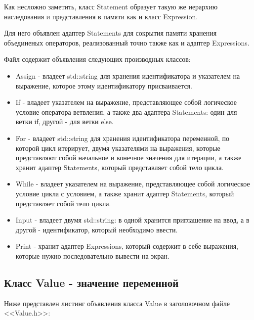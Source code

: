 Как несложно заметить, класс Statement образует такую же
иерархию наследования и представления в памяти как и 
класс Expression.

Для него объявлен адаптер Statements для сокрытия
памяти хранения объединеных операторов,
реализованный точно также как и адаптер Expressions.

Файл содержит объявления следующих производных классов:
\begin{itemize}
    \item Assign - владеет std::string для хранения 
          идентификатора и указателем на выражение, 
          которое этому идентификатору присваивается.

    \item If - владеет указателем на выражение,
          представляющее собой логическое условие
          оператора ветвления,
          а также два адаптера Statements:
          один для ветки if, другой - для ветки else.

    \item For - владеет std::string для хранения 
          идентификатора переменной, по которой 
          цикл итерирует,
          двумя указателями на выражения,
          которые представляют собой начальное
          и конечное значения для итерации,
          а также хранит адаптер Statements,
          который представляет собой тело цикла.

    \item While - владеет указателем на выражение,
          представляющее собой логическое условие
          цикла с условием,
          а также хранит адаптер Statements,
          который представляет собой тело цикла.

    \item Input - владеет двумя std::string:
          в одной хранится приглашение на ввод,
          а в другой - идентификатор, который необходимо
          ввести.

    \item Print - хранит адаптер Expressions,
          который содержит в себе выражения, которые
          нужно последовательно вывести на экран.
\end{itemize}

\subsection{Класс Value - значение переменной}

Ниже представлен листинг объявления класса Value 
в заголовочном файле <<Value.h>>:

